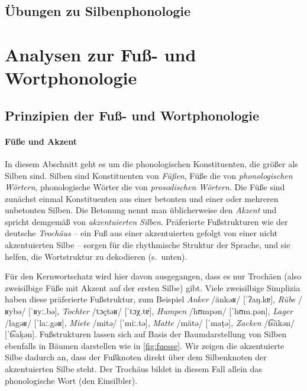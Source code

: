 \subsection{Übungen zu Silbenphonologie}


\section{Analysen zur Fuß- und Wortphonologie}
\label{sec:phonologie:analysenzurfussundwortphonologie}

\subsection{Prinzipien der Fuß- und Wortphonologie}

\paragraph*{Füße und Akzent}

In diesem Abschnitt geht es um die phonologischen Konstituenten, die größer als Silben sind.
Silben sind Konstituenten von \textit{Füßen}, Füße die von \textit{phonologischen Wörtern}, phonologische Wörter die von \textit{prosodischen Wörtern}.
Die Füße sind zunächst einmal Konstituenten aus einer betonten und einer oder mehreren unbetonten Silben.
Die Betonung nennt man üblicherweise den \textit{Akzent} und spricht demgemäß von \textit{akzentuierten Silben}.
Präferierte Fußstrukturen wie der deutsche \textit{Trochäus} -- ein Fuß aus einer akzentuierten gefolgt von einer nicht akzentuierten Silbe -- sorgen für die rhythmische Struktur der Sprache, und sie helfen, die Wortstruktur zu dekodieren (s.\ unten).

Für den Kernwortschatz wird hier davon ausgegangen, dass es nur Trochäen (also zweisilbige Füße mit Akzent auf der ersten Silbe) gibt.
Viele zweisilbige Simplizia haben diese präferierte Fußstruktur, zum Beispiel \textit{Anker} /ănkəʁ/ [ˈʔaŋ.kɐ], \textit{Rübe} /ʁybə/ [ˈʁyː.bə], \textit{Tochter} /tɔçtəʁ/ [ˈtɔχ.tɐ], \textit{Humpen} /hʊmpən/ [ˈhʊm.pən], \textit{Lager} /lagəʁ/ [ˈlaː.gəʁ], \textit{Miete} /mitə/ [ˈmiː.tə], \textit{Matte} /mătə/ [ˈmaṭə], \textit{Zacken} /t͡săkən/ [ˈt͡saḳən].
Fußstrukturen lassen sich auf Basis der Baumdarstellung von Silben ebenfalls in Bäumen darstellen wie in \ref{fig:fuesse}.
Wir zeigen die akzentuierte Silbe dadurch an, dass der Fußknoten direkt über dem Silbenknoten der akzentuierten Silbe steht.
Der Trochäus bildet in diesem Fall allein das phonologische Wort (den Einsilbler). 


